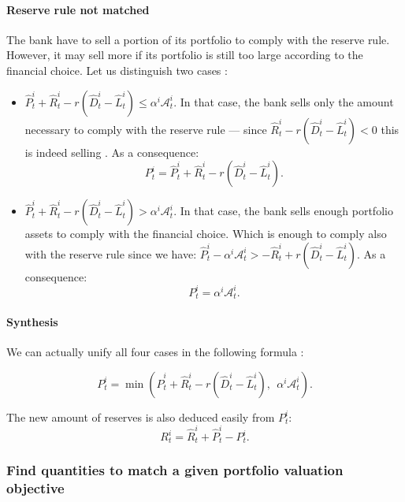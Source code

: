 \documentclass{article}
\newcommand{\wh}{\widehat}
\begin{document}
\paragraph{Reserve rule not matched}
The bank have to sell a portion of its portfolio to comply with the reserve rule. However, it may sell more if its portfolio is still too large according to the financial choice. Let us distinguish two cases :
\begin{itemize}
    \item $\widehat{P}_t^i + \widehat{R}_t^i - r(\wh D_t^i - \wh L_t^i) \leq \alpha^i \mathcal{A}_t^i$. In that case, the bank sells only the amount necessary to comply with the reserve rule --- since $\widehat{R}_t^i - r(\wh D_t^i - \wh L_t^i) < 0$ this is indeed selling . As a consequence: 
    $$ P_t^{i} = \widehat{P}_t^i + \widehat{R}_t^i - r(\wh D_t^i - \wh L_t^i).$$
    \item $\widehat{P}_t^i + \widehat{R}_t^i - r(\wh D_t^i - \wh L_t^i) > \alpha^i \mathcal{A}_t^i$. In that case, the bank sells enough portfolio assets to comply with the financial choice. Which is enough to comply also with the reserve rule since we have: $\widehat{P}_t^i - \alpha^i \mathcal{A}_t^i > - \widehat{R}_t^i + r(\wh D_t^i - \wh L_t^i) $. As a consequence: 
    $$ P_t^i = \alpha^i \mathcal{A}_t^i.$$
    
\end{itemize}

\paragraph{Synthesis}
We can actually unify all four cases in the following formula : 

\begin{equation}\label{rebal_synthesis}
P_t^i = \min(\widehat{P}_t^i + \widehat{R}_t^i - r(\wh D_t^i - \wh L_t^i),~~\alpha^i \mathcal{A}_t^i).
\end{equation}

The new amount of reserves is also deduced easily from $P_t^i$: 
\begin{equation}\label{eq:rebal_reserves}
R_t^i = \widehat{R}_t^i + \widehat{P}_t^i - P_t^i.
\end{equation}

\subsubsection{Find quantities to match a given portfolio valuation objective}
\end{document}
